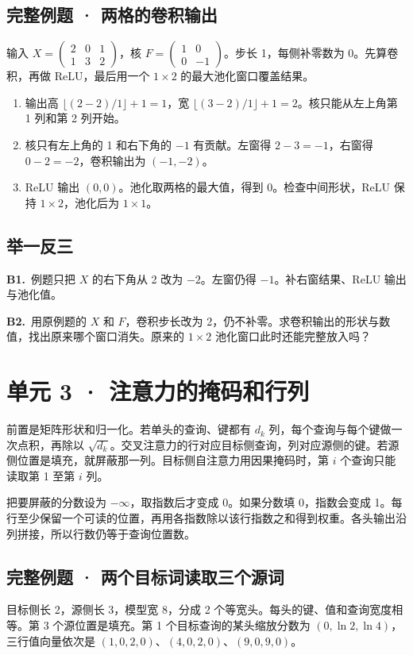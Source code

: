 \documentclass[UTF8,a4paper,11pt]{ctexart}
\newcommand{\CompactQuestion}[2]{\par\noindent\textbf{#1.}\ #2\par\vspace{.8em}}
\begin{document}
\subsection{完整例题 · 两格的卷积输出}
输入 $X=\begin{pmatrix}2&0&1\\1&3&2\end{pmatrix}$，核 $F=\begin{pmatrix}1&0\\0&-1\end{pmatrix}$。步长 1，每侧补零数为 0。先算卷积，再做 ReLU，最后用一个 $1\times2$ 的最大池化窗口覆盖结果。

\begin{enumerate}
\item 输出高 $\lfloor(2-2)/1\rfloor+1=1$，宽 $\lfloor(3-2)/1\rfloor+1=2$。核只能从左上角第 1 列和第 2 列开始。
\item 核只有左上角的 1 和右下角的 $-1$ 有贡献。左窗得 $2-3=-1$，右窗得 $0-2=-2$，卷积输出为 $(-1,-2)$。
\item ReLU 输出 $(0,0)$。池化取两格的最大值，得到 0。检查中间形状，ReLU 保持 $1\times2$，池化后为 $1\times1$。
\end{enumerate}
\subsection{举一反三}
\CompactQuestion{B1}{例题只把 $X$ 的右下角从 2 改为 $-2$。左窗仍得 $-1$。补右窗结果、ReLU 输出与池化值。}
\CompactQuestion{B2}{用原例题的 $X$ 和 $F$，卷积步长改为 2，仍不补零。求卷积输出的形状与数值，找出原来哪个窗口消失。原来的 $1\times2$ 池化窗口此时还能完整放入吗？}
\clearpage
\section{单元 3 · 注意力的掩码和行列}
前置是矩阵形状和归一化。若单头的查询、键都有 $d_k$ 列，每个查询与每个键做一次点积，再除以 $\sqrt{d_k}$。交叉注意力的行对应目标侧查询，列对应源侧的键。若源侧位置是填充，就屏蔽那一列。目标侧自注意力用因果掩码时，第 $i$ 个查询只能读取第 1 至第 $i$ 列。

把要屏蔽的分数设为 $-\infty$，取指数后才变成 0。如果分数填 0，指数会变成 1。每行至少保留一个可读的位置，再用各指数除以该行指数之和得到权重。各头输出沿列拼接，所以行数仍等于查询位置数。

\subsection{完整例题 · 两个目标词读取三个源词}
目标侧长 2，源侧长 3，模型宽 8，分成 2 个等宽头。每头的键、值和查询宽度相等。第 3 个源位置是填充。第 1 个目标查询的某头缩放分数为 $(0,\ln2,\ln4)$，三行值向量依次是 $(1,0,2,0)$、$(4,0,2,0)$、$(9,0,9,0)$。
\end{document}
